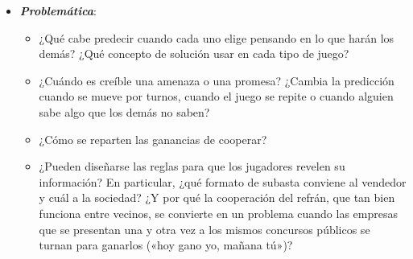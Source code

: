 \documentclass[11pt]{article}
\begin{document}
\begin{itemize}
\item \textbf{\emph{Problemática}}:
  \begin{itemize}
  \item ¿Qué cabe predecir cuando cada uno elige pensando en lo que harán los demás? ¿Qué concepto de solución usar en cada tipo de juego?
  \item ¿Cuándo es creíble una amenaza o una promesa? ¿Cambia la predicción cuando se mueve por turnos, cuando el juego se repite o cuando alguien sabe algo que los demás no saben?
  \item ¿Cómo se reparten las ganancias de cooperar?
  \item ¿Pueden diseñarse las reglas para que los jugadores revelen su información? En particular, ¿qué formato de subasta conviene al vendedor y cuál a la sociedad? ¿Y por qué la cooperación del refrán, que tan bien funciona entre vecinos, se convierte en un problema cuando las empresas que se presentan una y otra vez a los mismos concursos públicos se turnan para ganarlos («hoy gano yo, mañana tú»)?
  \end{itemize}


\end{itemize}
\end{document}
